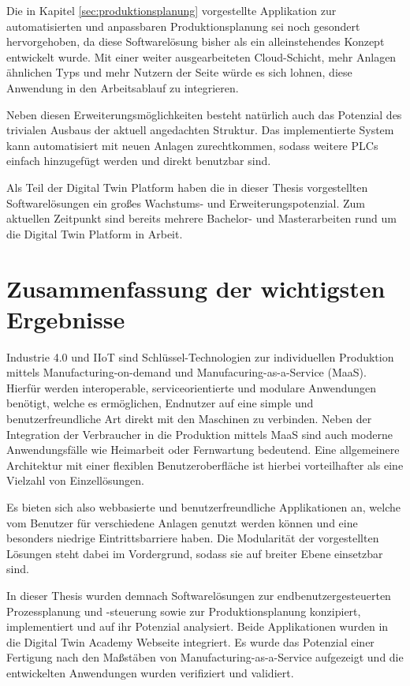 Die in Kapitel \ref{sec:produktionsplanung} vorgestellte Applikation zur automatisierten und anpassbaren Produktionsplanung sei noch gesondert hervorgehoben, da diese Softwarelösung bisher als ein alleinstehendes Konzept entwickelt wurde. Mit einer weiter ausgearbeiteten Cloud-Schicht, mehr Anlagen ähnlichen Typs und mehr Nutzern der Seite würde es sich lohnen, diese Anwendung in den Arbeitsablauf zu integrieren.

Neben diesen Erweiterungsmöglichkeiten besteht natürlich auch das Potenzial des trivialen Ausbaus der aktuell angedachten Struktur. Das implementierte System kann automatisiert mit neuen Anlagen zurechtkommen, sodass weitere PLCs einfach hinzugefügt werden und direkt benutzbar sind.

Als Teil der Digital Twin Platform haben die in dieser Thesis vorgestellten Softwarelösungen ein großes Wachstums- und Erweiterungspotenzial. Zum aktuellen Zeitpunkt sind bereits mehrere Bachelor- und Masterarbeiten rund um die Digital Twin Platform in Arbeit.

\section{Zusammenfassung der wichtigsten Ergebnisse}
\label{sec:zusammenfassung}

Industrie 4.0 und IIoT sind Schlüssel-Technologien zur individuellen Produktion mittels Manufacturing-on-demand und Manufacuring-as-a-Service (MaaS). Hierfür werden interoperable, serviceorientierte und modulare Anwendungen benötigt, welche es ermöglichen, Endnutzer auf eine simple und benutzerfreundliche Art direkt mit den Maschinen zu verbinden. Neben der Integration der Verbraucher in die Produktion mittels MaaS sind auch moderne Anwendungsfälle wie Heimarbeit oder Fernwartung bedeutend. Eine allgemeinere Architektur mit einer flexiblen Benutzeroberfläche ist hierbei vorteilhafter als eine Vielzahl von Einzellösungen.

Es bieten sich also webbasierte und benutzerfreundliche Applikationen an, welche vom Benutzer für verschiedene Anlagen genutzt werden können und eine besonders niedrige Eintrittsbarriere haben. Die Modularität der vorgestellten Lösungen steht dabei im Vordergrund, sodass sie auf breiter Ebene einsetzbar sind.

In dieser Thesis wurden demnach Softwarelösungen zur endbenutzergesteuerten Prozessplanung und -steuerung sowie zur Produktionsplanung konzipiert, implementiert und auf ihr Potenzial analysiert. Beide Applikationen wurden in die Digital Twin Academy Webseite integriert. Es wurde das Potenzial einer Fertigung nach den Maßstäben von Manufacturing-as-a-Service aufgezeigt und die entwickelten Anwendungen wurden verifiziert und validiert.
